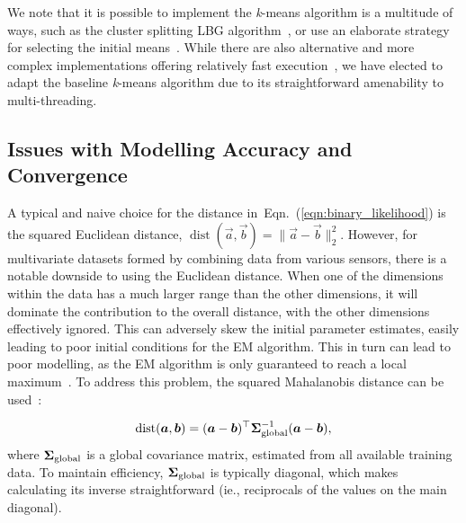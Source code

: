 We note that it is possible to implement the \mbox{{\it k}-means} algorithm is a multitude of ways,
such as the cluster splitting LBG algorithm~\cite{Linde80},
or use an elaborate strategy for selecting the initial means~\cite{Arthur_2007}.
While there are also alternative and more complex implementations offering relatively fast execution~\cite{Elkan_2003},
we have elected to adapt the baseline \mbox{{\it k}-means} algorithm due to its straightforward amenability to multi-threading. 


\vspace{1ex}
\subsection{Issues with Modelling Accuracy and Convergence}

A typical and naive choice for the distance in~Eqn.~(\ref{eqn:binary_likelihood})
is the squared Euclidean distance, \mbox{$\operatorname{dist}(\Vec{a}, \Vec{b}) = \| \Vec{a} - \Vec{b} \|^{2}_{2}$}.
However, for multivariate datasets formed by combining data from various sensors, there is a notable downside to using the Euclidean distance.
When one of the dimensions within the data has a much larger range than the other dimensions,
it will dominate the contribution to the overall distance, with the other dimensions effectively ignored.
This can adversely skew the initial parameter estimates, easily leading to poor initial conditions for the EM algorithm.
This in turn can lead to poor modelling, as the EM algorithm is only guaranteed to reach a local maximum~\cite{Dempster77,Duda01,Mitchell97}.
To address this problem, the squared Mahalanobis distance can be used~\cite{Bishop_2006,Duda01}:

\begin{equation}
\operatorname{dist}({\boldsymbol{a}}, {\boldsymbol{b}}) = ({\boldsymbol{a}} - {\boldsymbol{b}})^\top {\boldsymbol{\Sigma}}^{-1}_{\mathrm{global}} ({\boldsymbol{a}} - {\boldsymbol{b}}),
\end{equation}
\noindent where ${\boldsymbol{\Sigma}}_{\mathrm{global}}$ is a global covariance matrix, estimated from all available training data.
To maintain efficiency, ${\boldsymbol{\Sigma}}_{\mathrm{global}}$ is typically diagonal,
which makes calculating its inverse straightforward (ie., reciprocals of the values on the main diagonal).



